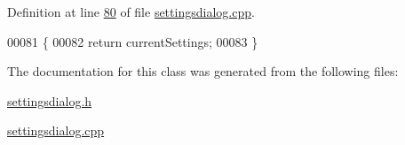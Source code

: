 Definition at line \hyperlink{a00131_source_l00080}{80} of file \hyperlink{a00131_source}{settingsdialog.\+cpp}.


\begin{DoxyCode}
00081 \{
00082     \textcolor{keywordflow}{return} currentSettings;
00083 \}
\end{DoxyCode}


The documentation for this class was generated from the following files\+:\begin{DoxyCompactItemize}
\item 
\hyperlink{a00132}{settingsdialog.\+h}\item 
\hyperlink{a00131}{settingsdialog.\+cpp}\end{DoxyCompactItemize}
